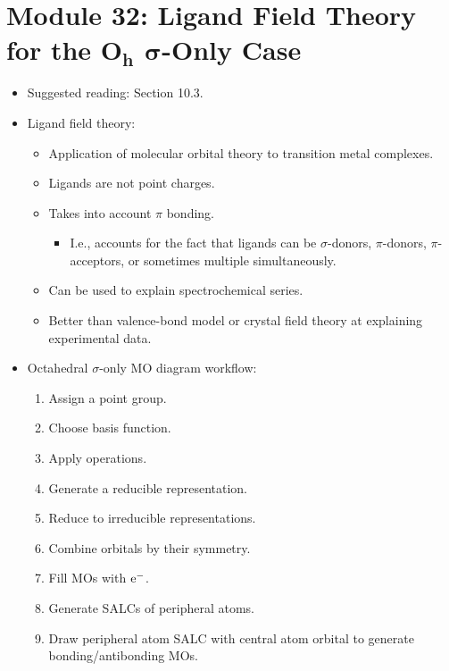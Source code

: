 \documentclass[../notes.tex]{subfiles}
\begin{document}
\section[Module 32: Ligand Field Theory for the \texorpdfstring{$O_h$}{TEXT} \texorpdfstring{$\sigma$}{TEXT}-Only Case]{Module 32: Ligand Field Theory for the \texorpdfstring{$\bm{O_h}$}{TEXT} \texorpdfstring{$\bm{\sigma}$}{TEXT}-Only Case}
\begin{itemize}
    \item {}Suggested reading: \textcite{bib:MiesslerFischerTarr} Section 10.3.
    \item Ligand field theory:
    \begin{itemize}
        \item Application of molecular orbital theory to transition metal complexes.
        \item Ligands are not point charges.
        \item Takes into account $\pi$ bonding.
        \begin{itemize}
            \item I.e., accounts for the fact that ligands can be $\sigma$-donors, $\pi$-donors, $\pi$-acceptors, or sometimes multiple simultaneously.
        \end{itemize}
        \item Can be used to explain spectrochemical series.
        \item Better than valence-bond model or crystal field theory at explaining experimental data.
    \end{itemize}
    \item Octahedral $\sigma$-only MO diagram workflow:
    \begin{enumerate}
        \item Assign a point group.
        \item Choose basis function.
        \item Apply operations.
        \item Generate a reducible representation.
        \item Reduce to irreducible representations.
        \item Combine orbitals by their symmetry.
        \item Fill MOs with $\e[-]$.
        \item Generate SALCs of peripheral atoms.
        \item Draw peripheral atom SALC with central atom orbital to generate bonding/antibonding MOs.

\end{enumerate}
\end{itemize}
\end{document}
